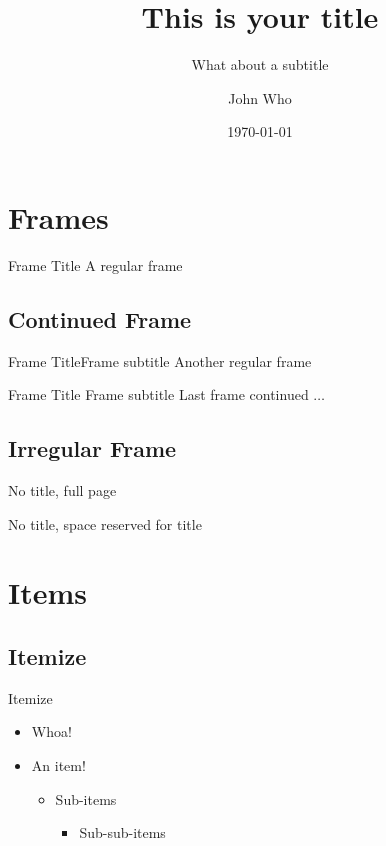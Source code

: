 \documentclass{beamer}
\title{This is your title}
\subtitle{What about a subtitle}
\author{John Who}
\institute{Institute of Galaxy}
\date{\today}
\begin{document}
	\beginning
	
	\section{Frames}
	
	\begin{frame}{Frame Title}
		A regular frame
	\end{frame}

	\subsection{Continued Frame}	
	
	\begin{frame}{Frame Title}{Frame subtitle}
		Another regular frame
	\end{frame}
	
	\begin{frame}{Frame Title }{Frame subtitle}
		Last frame continued $\ldots$ 
	\end{frame}
	
	\subsection{Irregular Frame}
	\begin{frame}
		No title, full page
	\end{frame}

	\begin{frame}{\null}
		No title, space reserved for title
	\end{frame}	
	
	\section{Items}
	
	\subsection{Itemize}
	
	\begin{frame}{Itemize}
		
		\begin{itemize}
			\item Whoa!
			\item An item!
			\begin{itemize}
				\item Sub-items
				\begin{itemize}
					\item Sub-sub-items
				\end{itemize}
			\end{itemize}
		\end{itemize}

	\end{frame}
	
\end{document}
